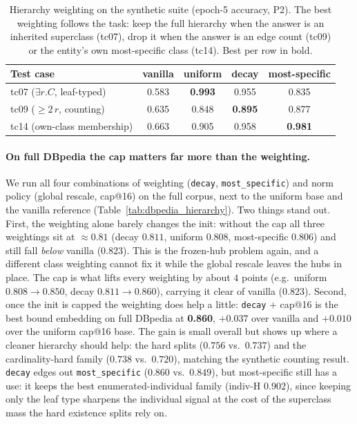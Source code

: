 \documentclass[a4paper,oneside,bibliography=totoc]{scrbook}
\begin{document}
\begin{table}[t]
\centering
\small
\caption{Hierarchy weighting on the synthetic suite (epoch-5 accuracy, P2). The
best weighting follows the task: keep the full hierarchy when the answer is an
inherited superclass (tc07), drop it when the answer is an edge count (tc09) or
the entity's own most-specific class (tc14).
Best per row in bold.}
\label{tab:hierarchy_synth}
\setlength{\tabcolsep}{6pt}
\begin{tabular}{lcccc}
\toprule
\textbf{Test case} & \textbf{vanilla} & \textbf{uniform} & \textbf{decay} & \textbf{most-specific} \\
\midrule
tc07 ($\exists r.C$, leaf-typed) & 0.583 & \textbf{0.993} & 0.955 & 0.835 \\
tc09 ($\geq 2\,r$, counting)     & 0.635 & 0.848 & \textbf{0.895} & 0.877 \\
tc14 (own-class membership)      & 0.663 & 0.905 & 0.958 & \textbf{0.981} \\
\bottomrule
\end{tabular}
\end{table}

\paragraph{On full DBpedia the cap matters far more than the weighting.}
We run all four combinations of weighting (\texttt{decay},
\texttt{most\_specific}) and norm policy (global rescale, cap@16) on the full
corpus, next to the uniform base and the vanilla reference
(Table~\ref{tab:dbpedia_hierarchy}). Two things stand out. First, the weighting
alone barely changes the init: without the cap all three weightings sit at
$\approx\!0.81$ (decay $0.811$, uniform $0.808$, most-specific $0.806$) and still
fall \emph{below} vanilla ($0.823$). This is the frozen-hub problem again, and a
different class weighting cannot fix it while the global rescale leaves the hubs
in place. The cap is what lifts every weighting by about $4$ points (e.g.\
uniform $0.808 \rightarrow 0.850$, decay $0.811 \rightarrow 0.860$), carrying it
clear of vanilla ($0.823$).
Second, once the init is capped the weighting does help a little: \texttt{decay}
+ cap@16 is the best bound embedding on full DBpedia at \textbf{0.860}, $+0.037$
over vanilla and $+0.010$ over the uniform cap@16 base. The gain is small overall
but shows up where a cleaner hierarchy should help: the hard splits ($0.756$ vs.\
$0.737$) and the cardinality-hard family ($0.738$ vs.\ $0.720$), matching the
synthetic counting result. \texttt{decay} edges out \texttt{most\_specific}
($0.860$ vs.\ $0.849$), but most-specific still has a use: it keeps the best
enumerated-individual family (indiv-H $0.902$), since keeping only the leaf type
sharpens the individual signal at the cost of the superclass mass the hard
existence splits rely on.
\end{document}
